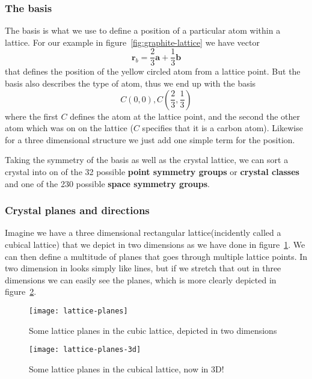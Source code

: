 \documentclass[11pt]{article}
\begin{document}
\subsubsection{The basis}\label{sec:basis}
The basis is what we use to define a position of a particular atom within a lattice. For our example in figure~\ref{fig:graphite-lattice} we have vector 
\begin{equation}
	\mathbf{r}_b = \frac{2}{3}\mathbf{a} + \frac{1}{3} \mathbf{b}
	\label{eq:basis}
\end{equation}
that defines the position of the yellow circled atom from a lattice point. But the basis also describes the type of atom, thus we end up with the basis 
\begin{equation}
	C(0,0),C(\frac{2}{3}, \frac{1}{3})
\end{equation}
where the first $C$ defines the atom at the lattice point, and the second the other atom which was on on the lattice ($C$ specifies that it is a carbon atom).
Likewise for a three dimensional structure we just add one simple term for the position. 

Taking the symmetry of the basis as well as the crystal lattice, we can sort a crystal into on of the 32 possible \textbf{point symmetry groups} or \textbf{crystal classes} and one of the 230 possible \textbf{space symmetry groups}.

\subsubsection{Crystal planes and directions}
Imagine we have a three dimensional rectangular lattice(incidently called a cubical lattice) that we depict in two dimensions as we have done in figure~\ref{fig:lattice-planes}. We can then define a multitude of planes that goes through multiple lattice points. In two dimension in looks simply like lines, but if we stretch that out in three dimensions we can easily see the planes, which is more clearly depicted in figure~\ref{fig:lattice-planes-3d}.
\begin{figure}[H]
	\centering
	\texttt{[image: lattice-planes]}
	\caption{Some lattice planes in the cubic lattice, depicted in two dimensions}
	\label{fig:lattice-planes}
\end{figure}
\begin{figure}[H]
	\centering
	\texttt{[image: lattice-planes-3d]}
	\caption{Some lattice planes in the cubical lattice, now in 3D!}
	\label{fig:lattice-planes-3d}
\end{figure}
\end{document}
